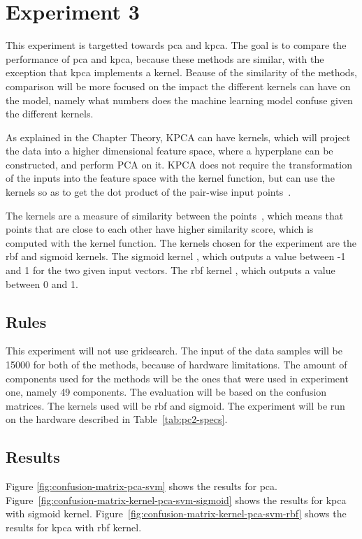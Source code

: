 \section{Experiment 3}\label{sec:experiment-3}
This experiment is targetted towards \gls{pca} and \gls{kpca}. The goal is to compare the performance of \gls{pca} and \gls{kpca}, because these methods are similar, with the exception that \gls{kpca} implements a kernel. Beause of the similarity of the methods, comparison will be more focused on the impact the different kernels can have on the model, namely what numbers does the machine learning model confuse given the different kernels.


As explained in the Chapter Theory, KPCA can have kernels, which will project the data into a higher dimensional feature space, where a hyperplane can be constructed, and perform PCA on it. KPCA does not require the transformation of the inputs into the feature space with the kernel function, but can use the kernels so as to get the dot product of the pair-wise input points~\cite{kpca-book}.


The kernels are a measure of similarity between the points~\cite{scikit-learn}, which means that points that are close to each other have higher similarity score, which is computed with the kernel function. The kernels chosen for the experiment are the \gls{rbf} and sigmoid kernels. The sigmoid kernel , which outputs a value between -1 and 1 for the two given input vectors. The \gls{rbf} kernel , which outputs a value between 0 and 1.


\subsection{Rules}
This experiment will not use gridsearch. The input of the data samples will be 15000 for both of the methods, because of hardware limitations. The amount of components used for the methods will be the ones that were used in experiment one, namely 49 components. The evaluation will be based on the confusion matrices. The kernels used will be \gls{rbf} and sigmoid. The experiment will be run on the hardware described in Table~\ref{tab:pc2-specs}.

\subsection{Results}
Figure \ref{fig:confusion-matrix-pca-svm} shows the results for \gls{pca}.
Figure~\ref{fig:confusion-matrix-kernel-pca-svm-sigmoid} shows the results for \gls{kpca} with sigmoid kernel.
Figure~\ref{fig:confusion-matrix-kernel-pca-svm-rbf} shows the results for \gls{kpca} with rbf kernel.


